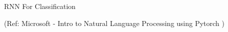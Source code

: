 







\begin{frame}
  \begin{center}
    {\Large RNN For Classification}
    
\tiny{(Ref:  Microsoft - Intro to Natural Language Processing using Pytorch )}
  \end{center}
\end{frame}

